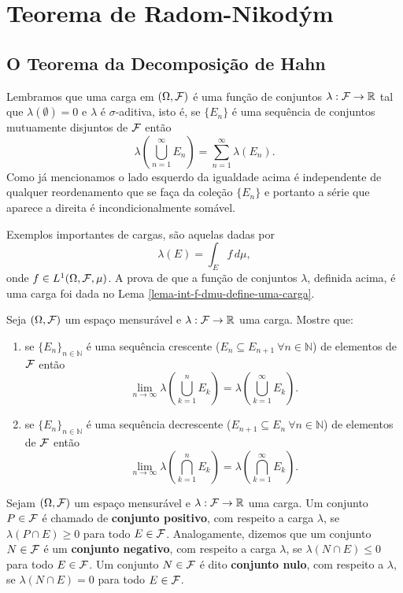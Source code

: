 \chapter[Aula 12]{Teorema de Radom-Nikodým}
\chaptermark{}


\section{O Teorema da Decomposição de Hahn}

Lembramos que uma carga em  $(\Omega,\mathcal{F})$ é uma 
função de conjuntos $\lambda:\mathcal{F}\to\mathbb{R}$ tal que
$\lambda(\emptyset)=0$ e $\lambda$ 
é $\sigma$-aditiva, isto é, se $\{E_n\}$ é uma
sequência de conjuntos mutuamente disjuntos de $\mathcal{F}$ 
então 
\[
\lambda\left(\bigcup_{n=1}^{\infty}E_n\right)
=
\sum_{n=1}^{\infty} \lambda(E_n).
\]
Como já mencionamos o lado esquerdo da igualdade acima é 
independente de qualquer reordenamento que se
faça da coleção $\{E_n\}$ e portanto a série que aparece a 
direita é incondicionalmente somável. 

Exemplos importantes de cargas, são aquelas 
dadas por 
\[
\lambda(E)=\int_{E} f\, d\mu,
\]
onde $f\in L^1(\Omega,\mathcal{F},\mu)$. A prova de que 
a função de conjuntos $\lambda$, definida acima, é uma 
carga foi dada no Lema \ref{lema-int-f-dmu-define-uma-carga}.

\begin{exercicio}
Seja $(\Omega,\mathcal{F})$ um espaço mensurável e $\lambda:\mathcal{F}\to\mathbb{R}$ 
uma carga. Mostre que: 
\begin{enumerate}
	\item 
	se $\{E_n\}_{n\in\mathbb{N}}$ é uma sequência crescente
	($E_{n}\subseteq E_{n+1} \ \forall n\in\mathbb{N}$) de 
	elementos de $\mathcal{F}$ então 
		\[
		\lim_{n\to\infty} \lambda\left( \bigcup_{k=1}^{n} E_k \right)
		=
		\lambda\left( \bigcup_{k=1}^{\infty} E_k \right).
		\]
	
	\item 
	se $\{E_n\}_{n\in\mathbb{N}}$ é uma sequência decrescente
	($E_{n+1}\subseteq E_{n} \ \forall n\in\mathbb{N}$) de 
	elementos de $\mathcal{F}$ então 
	\[
	\lim_{n\to\infty} \lambda\left( \bigcap_{k=1}^{n} E_k \right)
	=
	\lambda\left( \bigcap_{k=1}^{\infty} E_k \right).
	\]	 
\end{enumerate}
\end{exercicio}



\begin{definicao}
	Sejam $(\Omega,\mathcal{F})$ um espaço mensurável e $\lambda:\mathcal{F}\to\mathbb{R}$
	uma carga. Um conjunto $P\in \mathcal{F}$ é chamado de {\bf conjunto positivo},
	com respeito a carga $\lambda$, se $\lambda(P\cap E)\geq 0$ para todo 
	$E\in \mathcal{F}$. Analogamente, dizemos que 
	um conjunto $N\in \mathcal{F}$ é um {\bf conjunto negativo},
	com respeito a carga $\lambda$, se $\lambda(N\cap E)\leq 0$ para todo 
	$E\in \mathcal{F}$.
	Um conjunto $N\in \mathcal{F}$ é dito {\bf conjunto nulo}, com respeito a $\lambda$, 
	se $\lambda(N\cap E) = 0$ para todo 
	$E\in \mathcal{F}$.	
\end{definicao}


